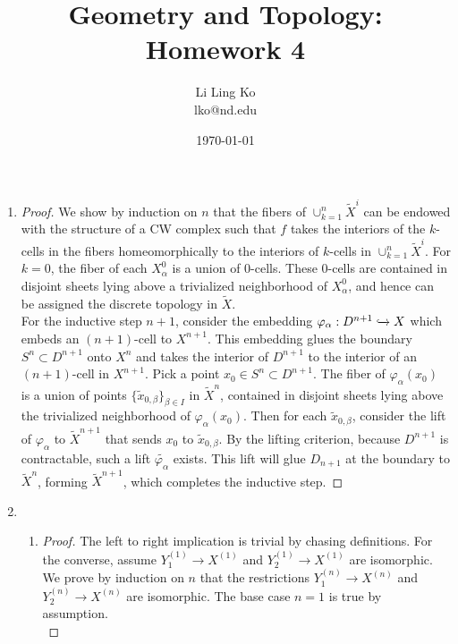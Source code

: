 \documentclass{article}
\begin{document}
\title{Geometry and Topology: Homework 4}
\author{Li Ling Ko\\ lko@nd.edu}
\date{\today}
\maketitle

\begin{enumerate}
  \item \begin{proof} We show by induction on $n$ that the fibers of
    $\cup_{k=1}^n\widetilde{X}^{i}$ can be endowed with the structure of a
    CW complex such that $f$ takes the interiors of the $k$-cells in the
    fibers homeomorphically to the interiors of $k$-cells in
    $\cup_{k=1}^n\widetilde{X}^{i}$. For $k=0$, the fiber of each
    $X^0_{\alpha}$ is a union of $0$-cells. These 0-cells are contained in
    disjoint sheets lying above a trivialized neighborhood of
    $X^0_{\alpha}$, and hence can be assigned the discrete topology in
    $\widetilde{X}$. \\

    For the inductive step $n+1$, consider the embedding
    $\varphi_\alpha:D^{n+1}\xhookrightarrow{}X$ which embeds an
    $(n+1)$-cell to $X^{n+1}$. This embedding glues the boundary
    $S^n\subset D^{n+1}$ onto $X^n$ and takes the interior of $D^{n+1}$ to
    the interior of an $(n+1)$-cell in $X^{n+1}$. Pick a point $x_0\in
    S^n\subset D^{n+1}$. The fiber of $\varphi_\alpha(x_0)$ is a union of
    points $\{\widetilde{x}_{0,\beta}\}_{\beta\in I}$ in $\widetilde{X}^n$,
    contained in disjoint sheets lying above the trivialized neighborhood
    of $\varphi_\alpha(x_0)$. Then for each $\widetilde{x}_{0,\beta}$,
    consider the lift of $\varphi_\alpha$ to $\widetilde{X}^{n+1}$ that
    sends $x_0$ to $\widetilde{x}_{0,\beta}$. By the lifting criterion,
    because $D^{n+1}$ is contractable, such a lift
    $\widetilde{\varphi_\alpha}$ exists. This lift will glue $D_{n+1}$ at
    the boundary to $\widetilde{X}^n$, forming $\widetilde{X}^{n+1}$, which
    completes the inductive step.
  \end{proof}

  \item
    \begin{enumerate}
      \item
      \begin{proof}
        The left to right implication is trivial by chasing definitions.
        For the converse, assume $Y_1^{(1)}\rightarrow X^{(1)}$ and
        $Y_2^{(1)}\rightarrow X^{(1)}$ are isomorphic. We prove by
        induction on $n$ that the restrictions $Y_1^{(n)}\rightarrow
        X^{(n)}$ and $Y_2^{(n)}\rightarrow X^{(n)}$ are isomorphic. The
        base case $n=1$ is true by assumption. \\


\end{proof}
\end{enumerate}
\end{enumerate}
\end{document}
